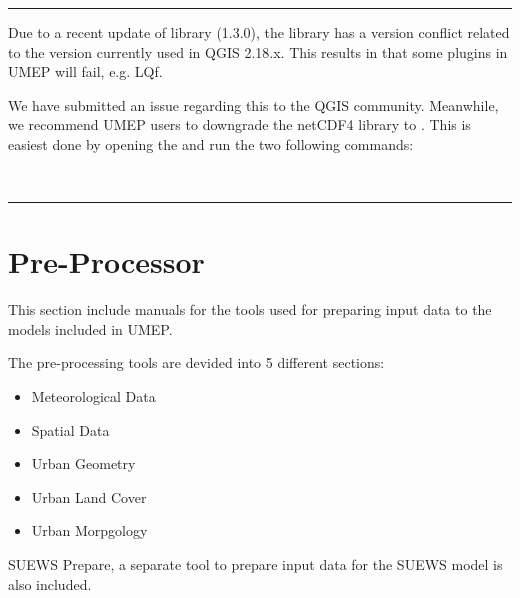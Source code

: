 \documentclass[letterpaper,10pt,english]{sphinxmanual}
\begin{document}
\bigskip\hrule\bigskip



Due to a recent update of  library (1.3.0), the 
library has a version conflict related to the  version
currently used in QGIS 2.18.x. This results in that some plugins in UMEP
will fail, e.g. LQf.

We have submitted an issue regarding this to the QGIS community.
Meanwhile, we recommend UMEP users to downgrade the netCDF4 library to
. This is easiest done by opening the  and run
the two following commands:

%
\begin{sphinxVerbatim}[commandchars=\\\{\}]
  
  
\end{sphinxVerbatim}


\bigskip\hrule\bigskip



\chapter{Pre-Processor}
\label{\detokenize{pre-processor/Pre-Processor:pre-processor}}\label{\detokenize{pre-processor/Pre-Processor::doc}}
This section include manuals for the tools used for preparing input data to the models included in UMEP.

The pre-processing tools are devided into 5 different sections:
\begin{itemize}
\item {} 
Meteorological Data

\item {} 
Spatial Data

\item {} 
Urban Geometry

\item {} 
Urban Land Cover

\item {} 
Urban Morpgology

\end{itemize}

SUEWS Prepare, a separate tool to prepare input data for the SUEWS model is also included.
\end{document}
